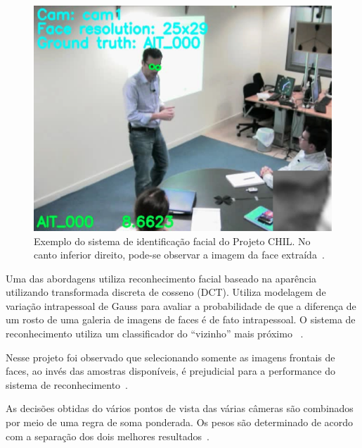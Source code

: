 	\begin{figure}[hbt]
		\begin{center}
			\includegraphics[scale=0.4]{figuras/3.TrabalhosCorrelatos/chil.png}
		\end{center}
		\caption{Exemplo do sistema de identificação facial do Projeto CHIL. No canto inferior direito, pode-se observar a imagem da face extraída~\cite{chil}.}
		\label{chil}
	\end{figure}

Uma das abordagens utiliza reconhecimento facial baseado na aparência utilizando transformada discreta de cosseno (DCT). Utiliza modelagem de variação intrapessoal de Gauss para avaliar a probabilidade de que a diferença de um rosto de uma galeria de imagens de faces é de fato intrapessoal. O sistema de reconhecimento utiliza um classificador do ``vizinho'' mais próximo ~\cite{chil}.

Nesse projeto foi observado que selecionando somente as imagens frontais de faces, ao invés das amostras disponíveis, é prejudicial para a performance do sistema de reconhecimento~\cite{chil}.

As decisões obtidas do vários pontos de vista das várias câmeras são combinados por meio de uma regra de soma ponderada. Os pesos são determinado de acordo com a separação dos dois melhores resultados~\cite{chil}.




